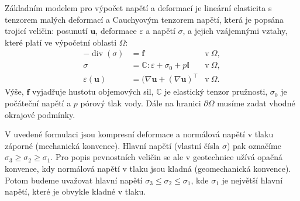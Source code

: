 \documentclass{article}
\def\eps{\varepsilon}
\def\T{\intercal}
\def\div{\operatorname{div}}
\def\vc#1{\mathbf{\boldsymbol{#1}}}     %
\def\tn#1{{\mathbb{#1}}}    %
\begin{document}
Základním modelem pro výpočet napětí a deformací je lineární elasticita s tenzorem malých deformací a Cauchyovým tenzorem napětí, která je popsána trojicí veličin: posunutí $\vc u$, deformace $\eps$ a napětí $\sigma$, a jejich vzájemnými vztahy, které platí ve výpočetní oblasti $\Omega$:
\begin{align*}
	- \div(\sigma) &= \vc f &\mbox{v} \ \Omega, \\
	\sigma &= \tn C : \eps + \sigma_0 + p\tn I  &\mbox{v} \ \Omega, \\
	\eps(\vc u) &= (\nabla \vc u + (\nabla \vc u)^\T &\mbox{v} \ \Omega.
\end{align*}
Výše, $\vc f$ vyjadřuje hustotu objemových sil, $\tn C$ je elastický tenzor pružnosti, $\sigma_0$ je počáteční napětí a $p$ pórový tlak vody. 
Dále na hranici $\partial \Omega$ musíme zadat vhodné okrajové podmínky.

V uvedené formulaci jsou kompresní deformace a normálová napětí v tlaku záporné (mechanická konvence). 
Hlavní napětí (vlastní čísla $\sigma$) pak označíme $\sigma_3 \geq \sigma_2 \geq \sigma_1$.
Pro popis pevnostních veličin se ale v geotechnice užívá opačná konvence, kdy normálová napětí v tlaku jsou kladná (geomechanická konvence).
Potom budeme uvažovat hlavní napětí $\sigma_3 \leq \sigma_2 \leq \sigma_1$, kde $\sigma_1$ je největší hlavní napětí, které je obvykle kladné v tlaku.
\end{document}
